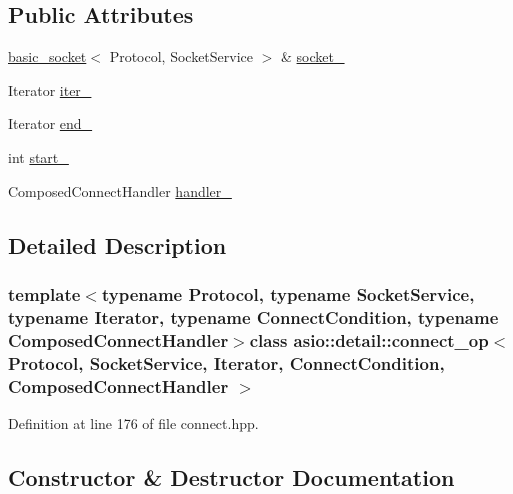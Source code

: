 \subsection*{Public Attributes}
\begin{DoxyCompactItemize}
\item 
\hyperlink{classasio_1_1basic__socket}{basic\+\_\+socket}$<$ Protocol, Socket\+Service $>$ \& \hyperlink{classasio_1_1detail_1_1connect__op_a38289f9267dfa7a99f664446e8c12d4a}{socket\+\_\+}
\item 
Iterator \hyperlink{classasio_1_1detail_1_1connect__op_a4a8d375fb61d65920b8e380fac9b2d1c}{iter\+\_\+}
\item 
Iterator \hyperlink{classasio_1_1detail_1_1connect__op_a54be3d73b550302179f26367a00e869c}{end\+\_\+}
\item 
int \hyperlink{classasio_1_1detail_1_1connect__op_ae6621575bc6e65a13db6d377201d7bac}{start\+\_\+}
\item 
Composed\+Connect\+Handler \hyperlink{classasio_1_1detail_1_1connect__op_a8d277d2fde22cf3c2d3e8085e3e46103}{handler\+\_\+}
\end{DoxyCompactItemize}


\subsection{Detailed Description}
\subsubsection*{template$<$typename Protocol, typename Socket\+Service, typename Iterator, typename Connect\+Condition, typename Composed\+Connect\+Handler$>$class asio\+::detail\+::connect\+\_\+op$<$ Protocol, Socket\+Service, Iterator, Connect\+Condition, Composed\+Connect\+Handler $>$}



Definition at line 176 of file connect.\+hpp.



\subsection{Constructor \& Destructor Documentation}
\hypertarget{classasio_1_1detail_1_1connect__op_a457fd005df6d071fd4961facdc6ce8f8}{}
